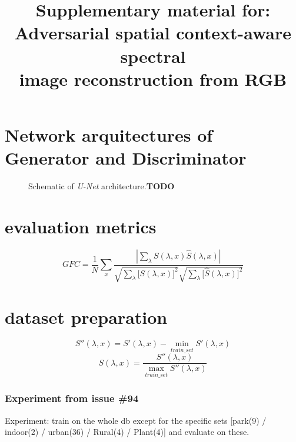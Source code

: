 \documentclass{bmvc2k}
\title{Supplementary material for:\\Adversarial spatial context-aware spectral\\image reconstruction from RGB}
\begin{document}
\maketitle



\appendix
\section{Network arquitectures of Generator and Discriminator}

\begin{figure*}
	\begin{center}
	\end{center}
	\caption{Schematic of \emph{U-Net} architecture.\textbf{TODO}}
	\label{fig:unet}
\end{figure*}

\section{evaluation metrics}

\begin{equation} \label{eq:gfc_def}
GFC = \dfrac{1}{N}\sum_x\frac{|\displaystyle\sum_{\lambda} S(\lambda, x)\hat{S}(\lambda,x)|}{\sqrt{\displaystyle\sum_{\lambda}\big[ S(\lambda, x)\big]^2} \sqrt{\displaystyle\sum_{\lambda}\big[\hat{S}(\lambda, x)\big]^2}}
\end{equation}

\section{dataset preparation}
\begin{equation} \label{eq:preproc_smin}
S''(\lambda, x) = S'(\lambda, x) - \min_{train\_set}S'(\lambda, x)
\end{equation}
\begin{equation} \label{eq:preproc_smax}
S(\lambda, x) = \frac{S''(\lambda, x)}{\displaystyle \max_{train\_set}S''(\lambda, x)}
\end{equation}

	\subsubsection{Experiment from issue \#94}
    Experiment: train on the whole db except for the specific sets [park(9) / indoor(2) / urban(36) / Rural(4) / Plant(4)] and evaluate on these.
\end{document}
